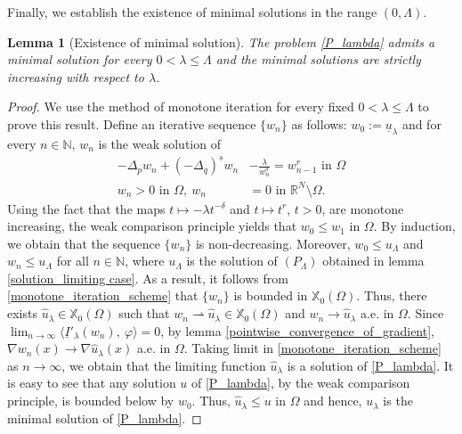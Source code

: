\documentclass[reqno,oneside]{amsart}
\newtheorem{lemma}[theorem]{Lemma}
\theoremstyle{definition}
\theoremstyle{remark}
\numberwithin{equation}{section}
\newcommand{\Om} {\Omega}
\newcommand{\p}{\Delta_p}
\newcommand{\qs}{(-\Delta_q)^s}
\newcommand{\bdry}{\mathbb{R}^N \setminus \Omega}
\newcommand{\rar}{\rightarrow}
\newcommand{\na} {\nabla}
\newcommand{\sn}{\mathbb{N}}
\newcommand{\xo}{\mathbb{X}_0}
\newcommand{\il}{\underline{I}}
\newcommand{\la} {\lambda}
\begin{document}
Finally, we establish the existence of minimal solutions in the range $(0, \Lambda)$.

\begin{lemma}[Existence of minimal solution]\label{minimal solution}
    The problem \eqref{P_lambda} admits a minimal solution for every $0< \la \leq \Lambda$ and the minimal solutions are strictly increasing with respect to $\la$.
\end{lemma}

\begin{proof}
    We use the method of monotone iteration for every fixed $0< \la \leq \Lambda$ to prove this result. Define an iterative sequence $\{w_n\}$ as follows: $w_0 := \underline{u}_{\la}$ and for every $n\in\sn$, $w_n$ is the weak solution of
    \begin{equation}\label{monotone_iteration_scheme}
        \begin{aligned}
            -\p w_n + \qs w_n &- \frac{\la}{w_n^{\delta}} = w_{n-1}^r \text{ in } \Om\\
            w_n > 0 \text{ in } \Om,\ w_n &= 0 \text{ in } \bdry.
        \end{aligned}
    \end{equation}
    Using the fact that the maps $t\mapsto -\la t^{-\delta}$ and $t\mapsto t^r$, $t>0$, are monotone increasing, the weak comparison principle yields that $w_0 \leq w_1$ in $\Om.$ By induction, we obtain that the sequence $\{w_n\}$ is non-decreasing. Moreover, $w_0 \leq u_{\Lambda}$ and $w_n \leq u_{\Lambda}$ for all $n\in\sn$, where $u_{\Lambda}$ is the solution of $(P_{\Lambda})$ obtained in lemma \ref{solution_limiting case}. As a result, it follows from \eqref{monotone_iteration_scheme} that $\{w_n\}$ is bounded in $\xo (\Om)$. Thus, there exists $\hat{u}_{\la} \in \xo(\Om)$ such that $w_n \rightharpoonup \hat{u}_{\la} \in \xo(\Om)$ and $w_n \rar \hat{u}_{\la}$ a.e. in $\Om$. Since $\lim_{n\rar\infty} \langle \il'_{\la} (w_n),\ \varphi \rangle =0$, by lemma \ref{pointwise_convergence_of_gradient}, $\na w_n (x) \rar \na \hat{u}_{\la} (x)$ a.e. in $\Om$. Taking limit in \eqref{monotone_iteration_scheme} as $n\rar\infty$, we obtain that the limiting function $\hat{u}_{\la}$ is a solution of \eqref{P_lambda}. It is easy to see that any solution $u$  of \eqref{P_lambda}, by the weak comparison principle, is bounded below by $w_0$. Thus, $\hat{u}_\lambda\leq u$ in $\Om$ and hence, $u_\lambda$ is the minimal solution of \eqref{P_lambda}.


\end{proof}
\end{document}

